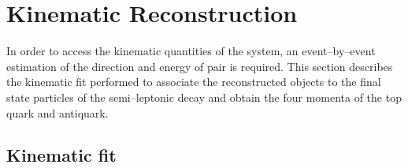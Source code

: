 \chapter{Kinematic Reconstruction}
\label{sec:reconstruction}

In order to access the kinematic quantities of the \ttbar{} system, an
event--by--event estimation of the direction and energy of \ttbar{}
pair is required. This section describes the kinematic fit performed
to associate the reconstructed objects to the final state particles of
the semi--leptonic \ttbar{} decay and obtain the four momenta of the
top quark and antiquark.

\section{Kinematic fit}

